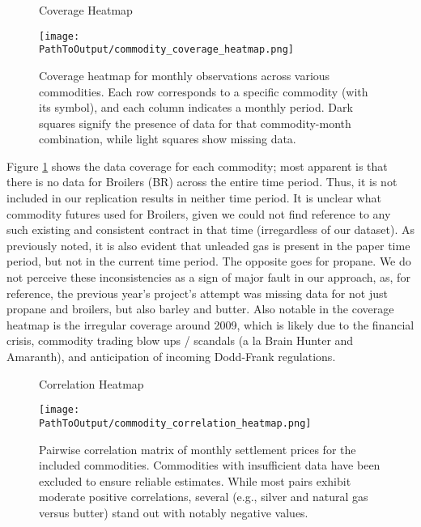 \documentclass[12pt]{article}
\begin{document}
\begin{figure}[ht!]
  \centering
  \caption{Coverage Heatmap}
  \begin{adjustbox}{max width=\textwidth}
  \texttt{[image: \\PathToOutput/commodity\_coverage\_heatmap.png]}
  \end{adjustbox}
  \caption*{Coverage heatmap for monthly observations across various commodities. 
  Each row corresponds to a specific commodity (with its symbol), and each column 
  indicates a monthly period. Dark squares signify the presence of data for that commodity-month 
  combination, while light squares show missing data. }
  \label{fig:commodity_coverage_heatmap}
\end{figure}

Figure \ref{fig:commodity_coverage_heatmap} shows the data coverage for each commodity; most apparent is that there is no data for Broilers (BR) across the entire time period.
Thus, it is not included in our replication results in neither time period. It is unclear what commodity futures \cite{Yang2013} used for Broilers, given we could not find reference to any such existing and consistent contract in that time (irregardless of our dataset).
As previously noted, it is also evident that unleaded gas is present in the paper time period, but not in the current time period.
The opposite goes for propane.
We do not perceive these inconsistencies as a sign of major fault in our approach, as, for reference, the previous year's project's attempt was missing data for not just propane and broilers, but also barley and butter.
Also notable in the coverage heatmap is the irregular coverage around 2009, which is likely due to the financial crisis, commodity trading blow ups / scandals (a la Brain Hunter and Amaranth), and anticipation of incoming Dodd-Frank regulations.

\begin{figure}[ht!]
  \centering
  \caption{Correlation Heatmap}
  \begin{adjustbox}{max width=\textwidth}
  \texttt{[image: \\PathToOutput/commodity\_correlation\_heatmap.png]}
  \end{adjustbox}
  \caption*{Pairwise correlation matrix of monthly settlement prices for the included commodities. Commodities 
  with insufficient data have been excluded to ensure reliable estimates. While most pairs exhibit moderate 
  positive correlations, several (e.g., silver and natural gas versus butter) stand out with notably negative values.}
\end{figure}
\end{document}
